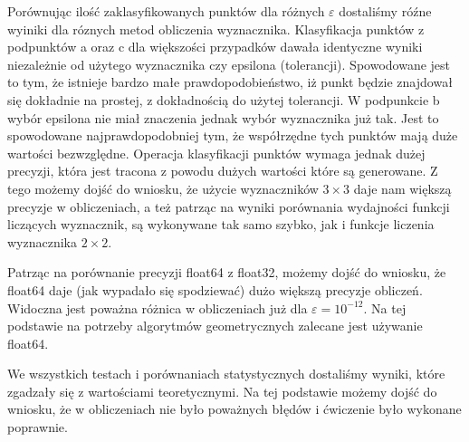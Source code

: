 \quad Porównując ilość zaklasyfikowanych punktów dla różnych $\varepsilon$ dostaliśmy róźne wyiniki 
dla róznych metod obliczenia wyznacznika. 
Klasyfikacja punktów z podpunktów a oraz c dla większości
przypadków dawała identyczne wyniki niezależnie od użytego
wyznacznika czy epsilona (tolerancji). Spowodowane jest to tym, że
istnieje bardzo małe prawdopodobieństwo, iż punkt będzie znajdował się
dokładnie na prostej, z dokładnością do użytej tolerancji. W podpunkcie
b wybór epsilona nie miał znaczenia jednak wybór wyznacznika już tak.
Jest to spowodowane
najprawdopodobniej tym, że współrzędne tych punktów mają duże
wartości bezwzględne. Operacja klasyfikacji punktów wymaga jednak
dużej precyzji, która jest tracona z powodu dużych wartości które są
generowane. Z tego możemy dojść do wniosku, że użycie wyznaczników $3 \times 3$ daje 
nam większą precyzje w obliczeniach, a też patrząc na wyniki porównania wydajności funkcji 
liczących wyznacznik, są wykonywane tak samo szybko, jak i funkcje liczenia wyznacznika $2 \times 2$.
\par
\quad Patrząc na porównanie precyzji float64 z float32, możemy dojść do wniosku, 
że float64 daje (jak wypadało się spodziewać) dużo większą precyzje obliczeń. 
Widoczna jest poważna różnica w obliczeniach już dla $\varepsilon = 10^{-12}$. 
Na tej podstawie na potrzeby algorytmów geometrycznych zalecane jest 
używanie float64.
\par
\quad We wszystkich testach i porównaniach statystycznych dostaliśmy 
wyniki, które zgadzały się z wartościami teoretycznymi. Na tej 
podstawie możemy dojść do wniosku, że w obliczeniach nie było poważnych 
błędów i ćwiczenie było wykonane poprawnie.
